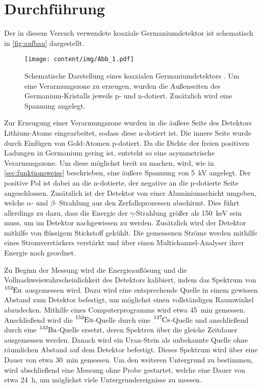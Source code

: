 \section{Durchführung}
\label{sec:durchfuehrung}

Der in diesem Versuch verwendete koaxiale Germaniumdetektor ist schematisch in \autoref{fig:aufbau} dargestellt.
\begin{figure}
    \centering
    \texttt{[image: content/img/Abb\_1.pdf]}
    \caption{Schematische Darstellung eines koaxialen Germaniumdetektors \cite{versuchsanleitung}.
    Um eine Verarmungszone zu erzeugen,
    wurden die Außenseiten des Germanium-Kristalls jeweils p- und n-dotiert.
    Zusätzlich wird eine Spannung angelegt.}
    \label{fig:aufbau}
\end{figure}

Zur Erzeugung einer Verarmungszone wurden in die äußere Seite des Detektors Lithium-Atome eingearbeitet,
sodass diese n-dotiert ist.
Die innere Seite wurde durch Einfügen von Gold-Atomen p-dotiert.
Da die Dichte der freien positiven Ladungen in Germanium gering ist,
entsteht so eine asymmetrische Verarmungszone.
Um diese möglichst breit zu machen,
wird,
wie in \autoref{sec:funktionsweise} beschrieben,
eine äußere Spannung von \SI{5}{\kilo\volt} angelegt.
Der positive Pol ist dabei an die n-dotierte,
der negative an die p-dotierte Seite angeschlossen.
Zusätzlich ist der Detektor von einer Aluminiumschicht umgeben,
welche $\alpha$- und $\beta$- Strahlung aus den Zerfallsprozessen abschirmt.
Dies führt allerdings zu dazu,
dass die Energie der $\gamma$-Strahlung größer als \SI{150}{\kilo\eV} sein muss, um im Detektor nachgewiesen zu werden.
Zusätzlich wird der Detektor mithilfe von flüssigem Stickstoff gekühlt.
Die gemessenen Ströme werden mithilfe eines Stromverstärkers verstärkt und über einen Multichannel-Analyser ihrer Energie nach geordnet.

Zu Beginn der Messung wird die Energieauflösung und die Vollnachweiswahrscheinlichkeit des Detektors kalibiert,
indem das Spektrum von $\ce{^{152}Eu}$ ausgemessen wird.
Dazu wird eine entsprechende Quelle in einem gewissen Abstand zum Detektor befestigt,
um möglichst einen vollständigen Raumwinkel abzudecken.
Mithilfe eines Computerprogramms wird etwa \SI{45}{\minute} gemessen.
Anschließend wird die $\ce{^{152}Eu}$-Quelle durch eine $\ce{^{137}Cs}$-Quelle und anschließend durch eine $\ce{^{133}Ba}$-Quelle ersetzt,
deren Spektren über die gleiche Zeitdauer ausgemessen werden.
Danach wird ein Uran-Stein als unbekannte Quelle ohne räumlichen Abstand auf dem Detektor befestigt.
Dieses Spektrum wird über eine Dauer von etwa \SI{30}{\minute} gemessen.
Um den weiteren Untergrund zu bestimmen,
wird abschließend eine Messung ohne Probe gestartet,
welche eine Dauer von etwa \SI{24}{\hour},
um möglichst viele Untergrundereignisse zu messen.